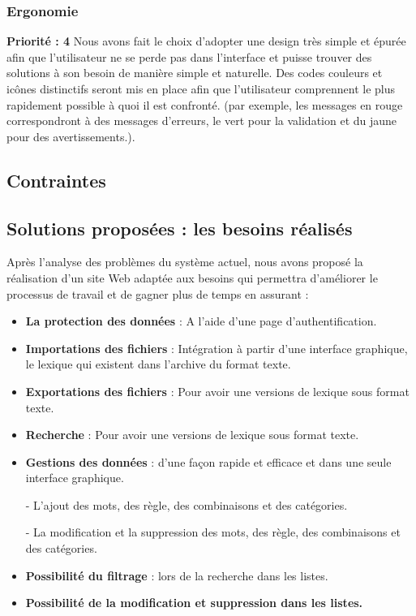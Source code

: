 \documentclass[12pt,a4paper]{article}
\begin{document}
\subsubsection{Ergonomie}
\textbf{Priorité : 4}
\smallbreak
Nous avons fait le choix d'adopter une design très simple et épurée afin que l'utilisateur ne se perde pas dans l'interface et puisse trouver des solutions à son besoin de manière simple et naturelle.
\smallbreak
Des codes couleurs et icônes distinctifs seront mis en place afin que l'utilisateur comprennent le plus rapidement possible à quoi il est confronté. (par exemple, les messages en rouge correspondront à des messages d'erreurs, le vert pour la validation et du jaune pour des avertissements.).

\subsection{Contraintes}
\subsection{Solutions proposées : les besoins réalisés}

Après l'analyse des problèmes du système actuel, nous avons proposé la réalisation d'un site Web  adaptée aux besoins 
qui permettra d'améliorer le processus de travail et de gagner plus de temps en assurant :

\begin{itemize}
\item \textbf{La protection des données } : A l'aide d'une page d'authentification.
\item \textbf{Importations des fichiers} : Intégration à partir d'une interface graphique, le lexique qui existent dans l'archive du format texte.
\item \textbf{Exportations des fichiers} : Pour avoir une versions de lexique sous format texte.
\item \textbf{Recherche} : Pour avoir une versions de lexique sous format texte.
\item \textbf{Gestions des données} : d'une façon rapide et efficace et dans une seule interface graphique.


- L'ajout des mots, des règle, des combinaisons et des catégories.


- La modification et la suppression des mots, des règle, des combinaisons et des catégories.
\item \textbf{Possibilité du filtrage} : lors de la recherche dans les listes.
\item \textbf{Possibilité de la modification et suppression dans les listes.}
\end{itemize}
\end{document}
